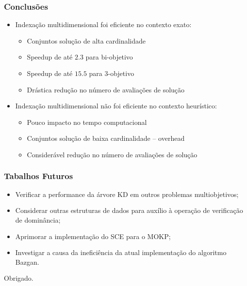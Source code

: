 \documentclass[10pt,xcolor=table,fleqn]{beamer}
\begin{document}
\begin{frame}
	\frametitle{Conclusões}
  \begin{itemize}
    \vspace{0.8em}
    \item{ Indexação multidimensional foi eficiente no contexto exato: } \pause
    \vspace{0.8em}
    \begin{itemize}
      \setlength\itemsep{0.6em}
      \item{ Conjuntos solução de alta cardinalidade } \pause
      \item{ Speedup de até $2.3$ para bi-objetivo } \pause
      \item{ Speedup de até $15.5$ para 3-objetivo } \pause
      \item{ Drástica redução no número de avaliações de solução }
    \end{itemize}
    \pause
    \vspace{0.8em}
    \item{ Indexação multidimensional não foi eficiente no contexto heurístico: } \pause
    \vspace{0.8em}
    \begin{itemize}
      \setlength\itemsep{0.6em}
      \item{ Pouco impacto no tempo computacional } \pause
      \item{ Conjuntos solução de baixa cardinalidade -- overhead } \pause
      \item{ Considerável redução no número de avaliações de solução }
    \end{itemize}
  \end{itemize}
\end{frame}

\begin{frame}
	\frametitle{Tabalhos Futuros}
  \begin{itemize}
    \setlength\itemsep{0.6em}
    \item{ Verificar a performance da árvore KD em outros problemas
      multiobjetivos;}
    \item{ Considerar outras estruturas de dados
      para auxílio à operação de verificação de dominância;}
    \item{ Aprimorar a implementação do SCE para o MOKP;}
    \item{ Investigar a causa da ineficiência da atual implementação
      do algoritmo Bazgan.}
  \end{itemize}
\end{frame}

\begin{frame}
  \vfill
  \begin{center}
    Obrigado.
  \end{center}
  \vfill
\end{frame}

\begin{frame}
\end{frame}
\end{document}
